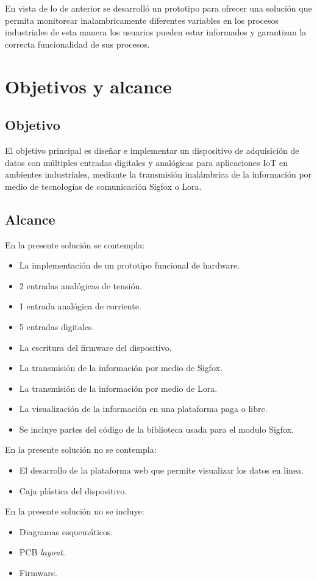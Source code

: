 En vista de lo de anterior se desarrolló un prototipo para ofrecer una solución que permita monitorear inalambricamente diferentes variables en los procesos industriales de esta manera los usuarios pueden estar informados y garantizan la correcta funcionalidad de sus procesos.

\section{Objetivos y alcance}

\subsection{Objetivo}
El objetivo principal es diseñar e implementar un dispositivo de adquisición de datos con múltiples entradas digitales y analógicas para aplicaciones IoT en ambientes industriales, mediante la transmisión inalámbrica de la información por medio de tecnologías de comunicación Sigfox o Lora. 

\subsection{Alcance}

En la presente solución se contempla:


\begin{itemize}
	\item La implementación de un prototipo funcional de hardware.
	\item 2 entradas analógicas de tensión.
	\item 1 entrada analógica de corriente.
	\item 5 entradas digitales.
	\item La escritura del firmware del dispositivo.
	\item La transmisión de la información por medio de Sigfox.
	\item La transmisión de la información por medio de Lora.
	\item La visualización de la información en una plataforma paga o libre.
	\item Se incluye partes del código de la biblioteca usada para el modulo Sigfox.
\end{itemize}
En la presente solución no se contempla:
\begin{itemize}
	\item El desarrollo de la plataforma web que permite visualizar los datos en linea.
	\item Caja plástica del dispositivo.
\end{itemize}
En la presente solución no se incluye:
\begin{itemize}
	\item Diagramas esquemáticos.
	\item PCB \textit{layout}.
	\item Firmware.
\end{itemize}

